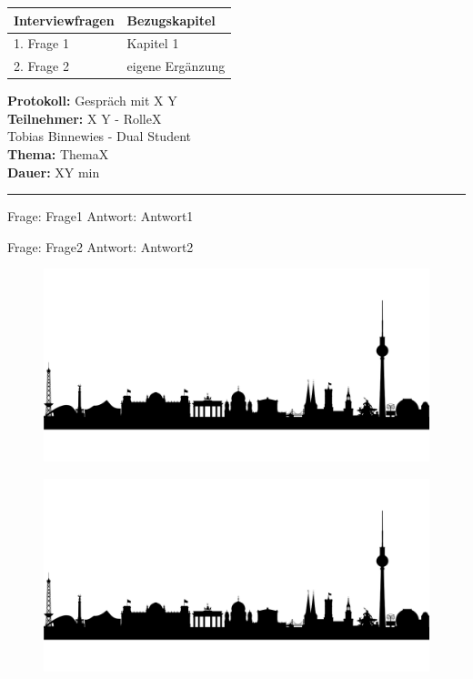 
\label{Anhang 1 - Interviewleitfaden für Technikverantwortlicher/ Entwickler}

\begin{tabular}{|p{10cm}|p{4cm}|}
    \hline
    \textbf{Interviewfragen} & \textbf{Bezugskapitel} \\
    \hline
    1. Frage 1 & Kapitel 1 \\
    \hline
    2. Frage 2 & eigene Ergänzung \\
    \hline
    \end{tabular}

\newpage

\label{appendix: Anhang 3}

\textbf{Protokoll:} Gespräch mit X Y \\
\textbf{Teilnehmer:} X Y - RolleX \\
    \hspace*{24,5mm} Tobias Binnewies - Dual Student \\
\textbf{Thema:} ThemaX \\
\textbf{Dauer:} XY min
\bigbreak
\noindent\rule[1ex]{\textwidth}{1pt} %
\bigbreak

Frage: Frage1
\bigbreak
Antwort: Antwort1
\bigbreak
\bigbreak

Frage: Frage2
\bigbreak
Antwort: Antwort2
\bigbreak


\newpage

\begin{figure}[ht]
    \centering\includegraphics[width=1.0\textwidth]{Abbildungen/Template.png}
\end{figure}

\begin{figure}[ht]
    \centering\includegraphics[width=1.0\textwidth]{Abbildungen/Template.png}
\end{figure}

\newpage

\bigbreak